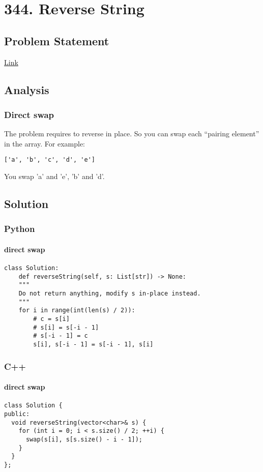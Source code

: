 \documentclass[11pt]{article}
\begin{document}
\section{344. Reverse String}
\label{sec:orgb89d52a}
\subsection{Problem Statement}
\label{sec:org541fa2a}
\href{https://leetcode.com/problems/reverse-string/}{Link}
\subsection{Analysis}
\label{sec:org6173cfe}
\subsubsection{Direct swap}
\label{sec:org1ed4cfe}
The problem requires to reverse in place. So you can swap each ``pairing element'' in the array. For example:
\begin{Verbatim}[frame=single]
['a', 'b', 'c', 'd', 'e']
\end{Verbatim}
You swap 'a' and 'e', 'b' and 'd'.

\subsection{Solution}
\label{sec:org2138020}
\subsubsection{Python}
\label{sec:org3fa6187}
\paragraph{direct swap}
\label{sec:org39c3986}
\begin{verbatim}
class Solution:
    def reverseString(self, s: List[str]) -> None:
	"""
	Do not return anything, modify s in-place instead.
	"""
	for i in range(int(len(s) / 2)):
	    # c = s[i]
	    # s[i] = s[-i - 1]
	    # s[-i - 1] = c
	    s[i], s[-i - 1] = s[-i - 1], s[i]
\end{verbatim}
\subsubsection{C++}
\label{sec:orgd91f532}
\paragraph{direct swap}
\label{sec:orgfea037d}
\begin{verbatim}
class Solution {
public:
  void reverseString(vector<char>& s) {
    for (int i = 0; i < s.size() / 2; ++i) {
      swap(s[i], s[s.size() - i - 1]);
    }
  }
};
\end{verbatim}
\end{document}
